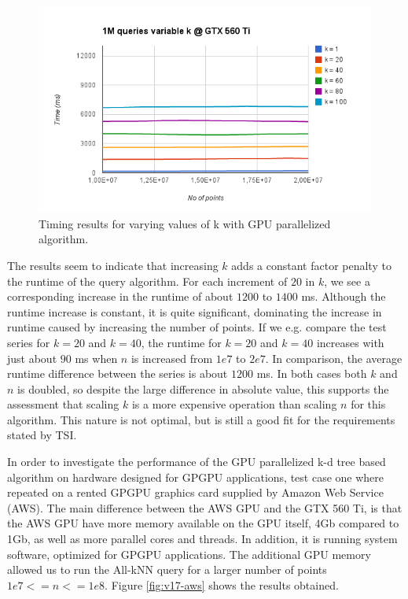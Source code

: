 \begin{figure}[ht!]
    \centering
    \includegraphics[width=120mm]{../gfx/v17-gpu-variable-k.png}
    \caption{Timing results for varying values of k with GPU parallelized algorithm.}
    \label{fig:v17-gpu-variable-k}
\end{figure}

The results seem to indicate that increasing $k$ adds a constant factor penalty to the runtime of the query algorithm. For each increment of $20$ in $k$, we see a corresponding increase in the runtime of about $1200$ to $1400$ ms. Although the runtime increase is constant, it is quite significant, dominating the increase in runtime caused by increasing the number of points. If we e.g. compare the test series for $k=20$ and $k=40$, the runtime for $k=20$ and $k=40$ increases with just about $90$ ms when $n$ is increased from $1e7$ to $2e7$. In comparison, the average runtime difference between the series is about $1200$ ms. In both cases both $k$ and $n$ is doubled, so despite the large difference in absolute value, this supports the assessment that scaling $k$ is a more expensive operation than scaling $n$ for this algorithm. This nature is not optimal, but is still a good fit for the requirements stated by TSI.

In order to investigate the performance of the GPU parallelized k-d tree based algorithm on hardware designed for GPGPU applications, test case one where repeated on a rented GPGPU graphics card supplied by Amazon Web Service (AWS). The main difference between the AWS GPU and the GTX 560 Ti, is that the AWS GPU have more memory available on the GPU itself, 4Gb compared to 1Gb, as well as more parallel cores and threads. In addition, it is running system software, optimized for GPGPU applications. The additional GPU memory allowed us to run the All-kNN query for a larger number of points $1e7<=n<=1e8$. Figure \ref{fig:v17-aws} shows the results obtained.

